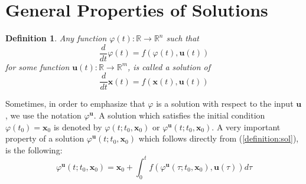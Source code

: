 \documentclass[a4paper,10pt,oneside]{book}
\newtheorem{definition}{Definition}
\begin{document}
\section{General Properties of Solutions}
\begin{definition}
  Any function $\varphi(t):\mathbb{R}\rightarrow\mathbb{R}^n$ such that
\begin{equation}
 \frac{d}{dt}\varphi(t)=f(\varphi(t),\mathbf{u}(t))\label{definition:sol}
\end{equation}
for some function $\mathbf{u}(t):\mathbb{R}\rightarrow\mathbb{R}^m$, is called a solution of
\begin{equation}\label{stateSpaceModel}
 \frac{d}{dt}\mathbf{x}(t)=f(\mathbf{x}(t),\mathbf{u}(t))
\end{equation}
\end{definition}
Sometimes, in order to emphasize that $\varphi$ is a solution with respect to the input $\mathbf{u}$, we use the notation $\varphi^{\mathbf{u}}$. A solution which satisfies the initial condition $\varphi(t_0)=\mathbf{x}_0$ is denoted by $\varphi(t;t_0,\mathbf{x}_0)$ or $\varphi^{\mathbf{u}}(t;t_0,\mathbf{x}_0)$. A very important property of a solution $\varphi^{\mathbf{u}}(t;t_0,\mathbf{x}_0)$ which follows directly from (\ref{definition:sol}), is the following:
\begin{equation}
 \varphi^{\mathbf{u}}(t;t_0,\mathbf{x}_0)=\mathbf{x}_0+\int_{0}^{t}f(\varphi^{\mathbf{u}}(\tau;t_0,\mathbf{x}_0),\mathbf{u}(\tau))d\tau\label{SOL-integral}
\end{equation}
\end{document}
